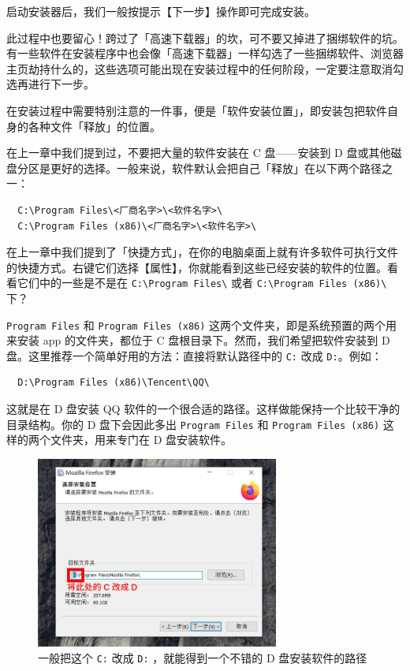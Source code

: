 启动安装器后，我们一般按提示【下一步】操作即可完成安装。

\begin{note}
  此过程中也要留心！跨过了「高速下载器」的坎，可不要又掉进了捆绑软件的坑。有一些软件在安装程序中也会像「高速下载器」一样勾选了一些捆绑软件、浏览器主页劫持什么的，这些选项可能出现在安装过程中的任何阶段，一定要注意取消勾选再进行下一步。
\end{note}

在安装过程中需要特别注意的一件事，便是「软件安装位置」，即安装包把软件自身的各种文件「释放」的位置。

在上一章中我们提到过，不要把大量的软件安装在 C 盘——安装到 D 盘或其他磁盘分区是更好的选择。一般来说，软件默认会把自己「释放」在以下两个路径之一：

\begin{verbatim}
  C:\Program Files\<厂商名字>\<软件名字>\
  C:\Program Files (x86)\<厂商名字>\<软件名字>\
\end{verbatim}

在上一章中我们提到了「快捷方式」，在你的电脑桌面上就有许多软件可执行文件的快捷方式。右键它们选择【属性】，你就能看到这些已经安装的软件的位置。看看它们中的一些是不是在 \verb|C:\Program Files\| 或者 \verb|C:\Program Files (x86)\| 下？

\verb|Program Files| 和 \verb|Program Files (x86)| 这两个文件夹，即是系统预置的两个用来安装 app 的文件夹，都位于 C 盘根目录下。然而，我们希望把软件安装到 D 盘。这里推荐一个简单好用的方法：直接将默认路径中的 \verb|C:| 改成 \verb|D:|。例如：

\begin{verbatim}
  D:\Program Files (x86)\Tencent\QQ\
\end{verbatim}

这就是在 D 盘安装 QQ 软件的一个很合适的路径。这样做能保持一个比较干净的目录结构。你的 D 盘下会因此多出 \verb|Program Files| 和 \verb|Program Files (x86)| 这样的两个文件夹，用来专门在 D 盘安装软件。

\begin{figure}[htb!]
  \centering
  \includegraphics[width=8cm]{assets/Change_C_to_D.jpg}
  \caption{一般把这个 \texttt{C:} 改成 \texttt{D:} ，就能得到一个不错的 D 盘安装软件的路径}
  \label{change-c-to-d}
\end{figure}


